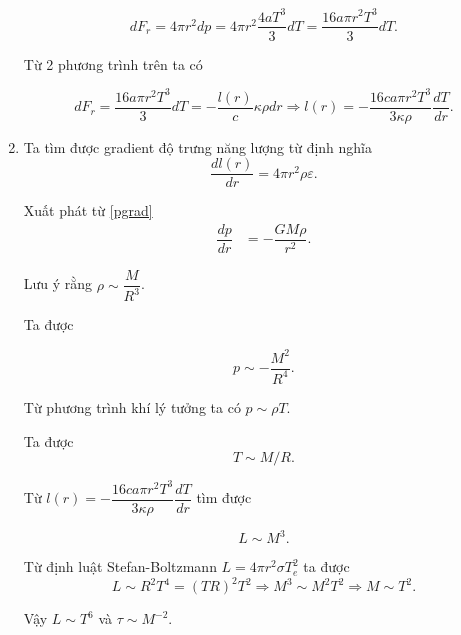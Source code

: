\begin{enumerate}
\begin{equation}
    dF_r =4\pi r^2 dp =4 \pi r^2 \dfrac{4aT^3}{3}dT =\dfrac{16a\pi r^2 T^3}{3}dT.
\end{equation}

Từ 2 phương trình trên ta có

\begin{equation}
    dF_r=\dfrac{16a\pi r^2 T^3}{3}dT=-\dfrac{l(r)}{c} \kappa \rho dr \Longrightarrow l(r) = -\dfrac{16ca\pi r^2 T^3}{3\kappa \rho}\dfrac{dT}{dr}. \label{eq_9_12}
\end{equation}

\item Ta tìm được gradient độ trưng năng lượng từ định nghĩa
\begin{equation}
    \dfrac{dl(r)}{dr}=4\pi r^2 \rho \varepsilon.\label{eq_10_12}
\end{equation}

Xuất phát từ \eqref{pgrad}
\begin{equation}
    \begin{split}
    \dfrac{dp}{dr}&= -\dfrac{GM \rho}{r^2}.
\end{split}
\end{equation}

Lưu ý rằng $\rho \sim \dfrac{M}{R^3}$.

Ta được

\begin{equation}
    p \sim -\dfrac{M^2}{R^4}.
\end{equation}

Từ phương trình khí lý tưởng ta có $p \sim \rho T$.

Ta được 
\begin{equation}
    T \sim M/R.
\end{equation}

Từ $l(r)=-\dfrac{16ca\pi r^2 T^3}{3\kappa \rho}\dfrac{dT}{dr}$ tìm được

\begin{equation}
    L \sim M^3.\label{eq_14_12}
\end{equation}

Từ định luật Stefan-Boltzmann $L=4\pi r^2 \sigma T^2_e$ ta được
\begin{equation}
    L \sim R^2T^4 = (TR)^2T^2 \Rightarrow M^3 \sim M^2T^2 \Rightarrow M \sim T^2. 
\end{equation}


Vậy $L \sim T^6$ và $\tau \sim M^{-2}$.


\end{enumerate}
